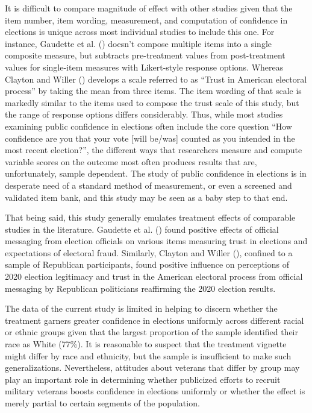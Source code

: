 \documentclass[
  12pt,
  letterpaper,
]{article}
\begin{document}
It is difficult to compare magnitude of effect with other studies given
that the item number, item wording, measurement, and computation of
confidence in elections is unique across most individual studies to
include this one. For instance, Gaudette et al.
() doesn't compose multiple items into
a single composite measure, but subtracts pre-treatment values from
post-treatment values for single-item measures with Likert-style
response options. Whereas Clayton and Willer
() develops a scale referred to as
``Trust in American electoral process'' by taking the mean from three
items. The item wording of that scale is markedly similar to the items
used to compose the trust scale of this study, but the range of response
options differs considerably. Thus, while most studies examining public
confidence in elections often include the core question ``How confidence
are you that your vote {[}will be/was{]} counted as you intended in the
most recent election?'', the different ways that researchers measure and
compute variable scores on the outcome most often produces results that
are, unfortunately, sample dependent. The study of public confidence in
elections is in desperate need of a standard method of measurement, or
even a screened and validated item bank, and this study may be seen as a
baby step to that end.

That being said, this study generally emulates treatment effects of
comparable studies in the literature. Gaudette et al.
() found positive effects of official
messaging from election officials on various items measuring trust in
elections and expectations of electoral fraud. Similarly, Clayton and
Willer (), confined to a sample of
Republican participants, found positive influence on perceptions of 2020
election legitimacy and trust in the American electoral process from
official messaging by Republican politicians reaffirming the 2020
election results.

The data of the current study is limited in helping to discern whether
the treatment garners greater confidence in elections uniformly across
different racial or ethnic groups given that the largest proportion of
the sample identified their race as White (77\%). It is reasonable to
suspect that the treatment vignette might differ by race and ethnicity,
but the sample is insufficient to make such generalizations.
Nevertheless, attitudes about veterans that differ by group may play an
important role in determining whether publicized efforts to recruit
military veterans boosts confidence in elections uniformly or whether
the effect is merely partial to certain segments of the population.
\end{document}
